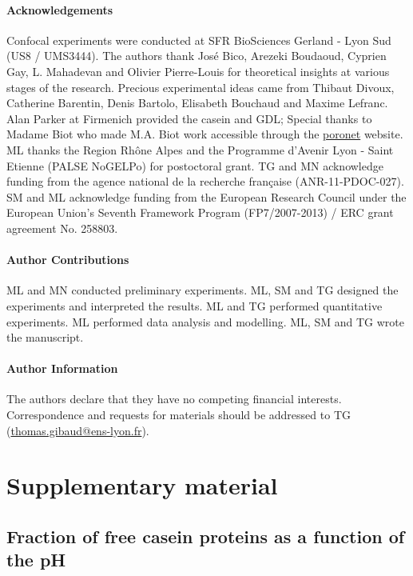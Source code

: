 \documentclass[twocolumn,superscriptaddress,showpacs,preprintnumbers,
amsmath,amssymb,prl]{revtex4-1}
\begin{document}
\paragraph*{Acknowledgements}
Confocal experiments were conducted at SFR BioSciences Gerland - Lyon Sud (US8 / UMS3444).
The authors thank Jos\'e Bico, Arezeki Boudaoud, Cyprien Gay, L. Mahadevan and Olivier Pierre-Louis for theoretical insights at various stages of the research. 
Precious experimental ideas came from Thibaut Divoux, Catherine Barentin, Denis Bartolo, Elisabeth Bouchaud and Maxime Lefranc.
Alan Parker at Firmenich provided the casein and GDL; 
Special thanks to Madame Biot who made M.A. Biot work accessible through the \href{http://www.olemiss.edu/sciencenet/poronet/}{poronet} website. 
ML thanks the Region Rhône Alpes and the Programme d'Avenir Lyon - Saint Etienne (PALSE NoGELPo) for postoctoral grant. 
TG and MN acknowledge funding from the agence national de la recherche fran\c{c}aise (ANR-11-PDOC-027). 
SM and ML acknowledge funding from the European Research Council under the European Union's Seventh Framework Program (FP7/2007-2013) / ERC grant agreement No. 258803.


\paragraph*{Author Contributions}
ML and MN conducted preliminary experiments. ML, SM and TG designed the experiments and interpreted the results. ML and TG performed quantitative experiments. ML performed data analysis and modelling. ML, SM and TG wrote the manuscript.


\paragraph*{Author Information} 
The authors declare that they have no competing financial interests. 
Correspondence and requests for materials should be addressed to TG (\href{mailto:thomas.gibaud@ens-lyon.fr}{thomas.gibaud@ens-lyon.fr}).






\clearpage
\newpage
\setcounter{figure}{0}

\section*{Supplementary material}


\subsection*{Fraction of free casein proteins as a function of the pH}
\end{document}
